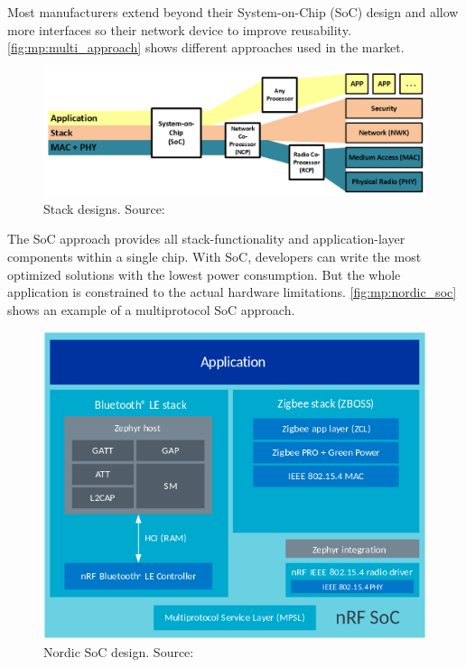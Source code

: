 Most manufacturers extend beyond their System-on-Chip (SoC) design and allow more interfaces so their network device to improve reusability. \autoref{fig:mp:multi_approach} shows different approaches used in the market.

\begin{figure}
    \centering
    \includegraphics[width=150mm, keepaspectratio]{figures/component-organization-silabs.png}
    \caption{Stack designs. Source: \cite{zigbee:silabs:ug103:3}}
    \label{fig:mp:multi_approach}
\end{figure}

The SoC approach provides all stack-functionality and application-layer components within a single chip. With SoC, developers can write the most optimized solutions with the lowest power consumption. But the whole application is constrained to the actual hardware limitations. \autoref{fig:mp:nordic_soc} shows an example of a multiprotocol SoC approach.

\begin{figure}
    \centering
    \includegraphics[width=130mm, keepaspectratio]{figures/nordic-soc-zigbee_platform_design_multi.png}
    \caption{Nordic SoC design. Source: \cite{nordic:zigbee}}
    \label{fig:mp:nordic_soc}
\end{figure}

